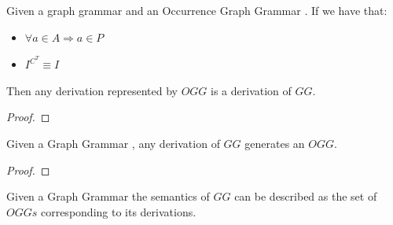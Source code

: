 \begin{thm} Given a graph grammar \graphGrammar{} and an Occurrence Graph Grammar \occurrenceGrammar{}. If we have that:
\begin{itemize}
  \item $\forall a \in A \Rightarrow a \in P$
  \item $I^{C^T} \equiv I$
\end{itemize}

Then any derivation represented by $OGG$ is a derivation of $GG$.

\end{thm}

\begin{proof}
\end{proof}

\begin{definition}
\end{definition}

\begin{thm} Given a Graph Grammar \graphGrammar{}, any derivation of $GG$ generates an $OGG$. 
\end{thm}

\begin{proof}
\end{proof}

\begin{definition} Given a Graph Grammar \graphGrammar{} the semantics of $GG$ can be described as the set of $OGGs$ corresponding to its derivations.
\end{definition}
